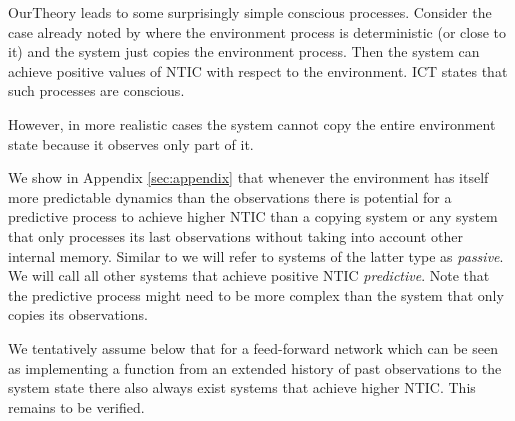 \documentclass[utf8]{article}
\begin{document}
            
            
            \ac{OurTheory} leads to some surprisingly simple conscious processes. Consider the case already noted by \citet{BERTSCHINGER.2006} where the environment process is deterministic (or close to it) and the system just copies the environment process. Then the system can achieve positive values of NTIC with respect to the environment. ICT states that such processes are conscious. 
            
            
            However, in more realistic cases the system cannot copy the entire environment state because it observes only part of it. 
            

            We show in Appendix \ref{sec:appendix} that whenever the environment has itself more predictable dynamics than the observations there is potential for a predictive process to achieve higher NTIC than a copying system or any system that only processes its last observations without taking into account other internal memory. Similar to \citet{BERTSCHINGER.2006} we will refer to systems of the latter type as \textit{passive}. We will call all other systems that achieve positive NTIC \textit{predictive}. Note that the predictive process might need to be more complex than the system that only copies its observations.
            
            We tentatively assume below that for a feed-forward network which can be seen as implementing a function from an extended history of past observations to the system state there also always exist systems that achieve higher NTIC. This remains to be verified. 
            
            
\end{document}
